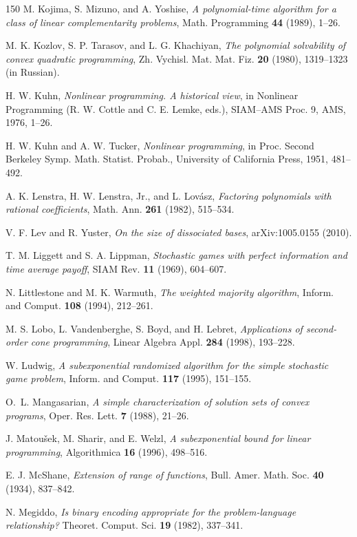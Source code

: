 \begin{thebibliography}{150}
M. Kojima, S. Mizuno, and A. Yoshise, \emph{A polynomial-time algorithm for a class of linear complementarity problems}, Math. Programming \textbf{44} (1989), 1--26.

M. K. Kozlov, S. P. Tarasov, and L. G. Khachiyan, \emph{The polynomial solvability of convex quadratic programming}, Zh. Vychisl. Mat. Mat. Fiz. \textbf{20} (1980), 1319--1323 (in Russian).

H. W. Kuhn, \emph{Nonlinear programming. A historical view}, in Nonlinear Programming (R. W. Cottle and C. E. Lemke, eds.), SIAM--AMS Proc. 9, AMS, 1976, 1--26.

H. W. Kuhn and A. W. Tucker, \emph{Nonlinear programming}, in Proc. Second Berkeley Symp. Math. Statist. Probab., University of California Press, 1951, 481--492.

A. K. Lenstra, H. W. Lenstra, Jr., and L. Lov\'asz, \emph{Factoring polynomials with rational coefficients}, Math. Ann. \textbf{261} (1982), 515--534.

V. F. Lev and R. Yuster, \emph{On the size of dissociated bases}, arXiv:1005.0155 (2010).

T. M. Liggett and S. A. Lippman, \emph{Stochastic games with perfect information and time average payoff}, SIAM Rev. \textbf{11} (1969), 604--607.

N. Littlestone and M. K. Warmuth, \emph{The weighted majority algorithm}, Inform. and Comput. \textbf{108} (1994), 212--261.

M. S. Lobo, L. Vandenberghe, S. Boyd, and H. Lebret, \emph{Applications of second-order cone programming}, Linear Algebra Appl. \textbf{284} (1998), 193--228.

W. Ludwig, \emph{A subexponential randomized algorithm for the simple stochastic game problem}, Inform. and Comput. \textbf{117} (1995), 151--155.

O.~L. Mangasarian, \emph{A simple characterization of solution sets of convex programs}, Oper. Res. Lett. \textbf{7} (1988), 21--26.

J. Matou\v{s}ek, M. Sharir, and E. Welzl, \emph{A subexponential bound for linear programming}, Algorithmica \textbf{16} (1996), 498--516.

E. J. McShane, \emph{Extension of range of functions}, Bull. Amer. Math. Soc. \textbf{40} (1934), 837--842.

N. Megiddo, \emph{Is binary encoding appropriate for the problem-language relationship?} Theoret. Comput. Sci. \textbf{19} (1982), 337--341.


\end{thebibliography}
